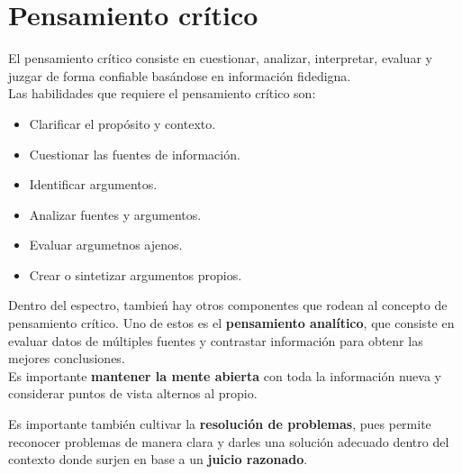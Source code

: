 \section*{Pensamiento crítico}

El pensamiento crítico consiste en cuestionar, analizar,
interpretar, evaluar y juzgar de forma confiable basándose
en información fidedigna. \\

Las habilidades que requiere el pensamiento crítico son:

\begin{itemize}
  \item{Clarificar el propósito y contexto.}
  \item{Cuestionar las fuentes de información.}
  \item{Identificar argumentos.}
  \item{Analizar fuentes y argumentos.}
  \item{Evaluar argumetnos ajenos.}
  \item{Crear o sintetizar argumentos propios.}
\end{itemize}

Dentro del espectro, tambień hay otros componentes que
rodean al concepto de pensamiento crítico. Uno de estos
es el \textbf{pensamiento analítico}, que consiste en
evaluar datos de múltiples fuentes y contrastar información
para obtenr las mejores conclusiones. \\

Es importante \textbf{mantener la mente abierta} con toda
la información nueva y considerar puntos de vista alternos
al propio.

Es importante también cultivar la \textbf{resolución de
  problemas}, pues permite reconocer problemas de manera
clara y darles una solución adecuado dentro del contexto
donde surjen en base a un  \textbf{juicio razonado}.
